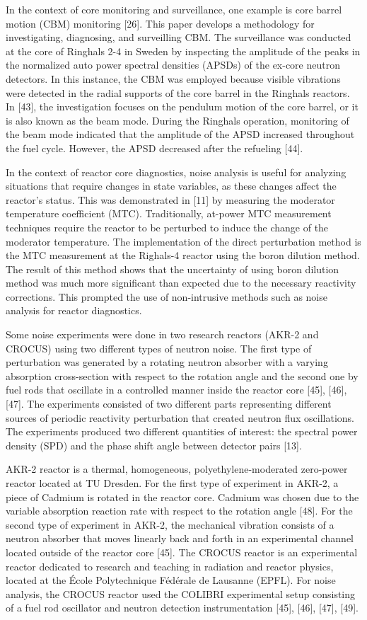 In the context of core monitoring and surveillance, one example is core barrel motion (CBM) monitoring [26]. This paper develops a methodology for investigating, diagnosing, and surveilling CBM. The surveillance was conducted at the core of Ringhals 2-4 in Sweden by inspecting the amplitude of the peaks in the normalized auto power spectral densities (APSDs) of the ex-core neutron detectors. 
In this instance, the CBM was employed because visible vibrations were detected in the radial supports of the core barrel in the Ringhals reactors. In [43], the investigation focuses on the pendulum motion of the core barrel, or it is also known as the beam mode. During the Ringhals operation, monitoring of the beam mode indicated that the amplitude of the APSD increased throughout the fuel cycle. However, the APSD decreased after the refueling [44]. 

In the context of reactor core diagnostics, noise analysis is useful for analyzing situations that require changes in state variables, as these changes affect the reactor's status. This was demonstrated in [11] by measuring the moderator temperature coefficient (MTC). Traditionally, at-power MTC measurement techniques require the reactor to be perturbed to induce the change of the moderator temperature. The implementation of the direct perturbation method is the MTC measurement at the Righals-4 reactor using the boron dilution method. The result of this method shows that the uncertainty of using boron dilution method was much more significant than expected due to the necessary reactivity corrections. This prompted the use of non-intrusive methods such as noise analysis for reactor diagnostics.

Some noise experiments were done in two research reactors (AKR-2 and CROCUS) using two different types of neutron noise. The first type of perturbation was generated by a rotating neutron absorber with a varying absorption cross-section with respect to the rotation angle and the second one by fuel rods that oscillate in a controlled manner inside the reactor core [45], [46], [47]. The experiments consisted of two different parts representing different sources of periodic reactivity perturbation that created neutron flux oscillations. The experiments produced two different quantities of interest: the spectral power density (SPD) and the phase shift angle between detector pairs [13]. 

AKR-2 reactor is a thermal, homogeneous, polyethylene-moderated zero-power reactor located at TU Dresden. For the first type of experiment in AKR-2, a piece of Cadmium is rotated in the reactor core. Cadmium was chosen due to the variable absorption reaction rate with respect to the rotation angle [48]. For the second type of experiment in AKR-2, the mechanical vibration consists of a neutron absorber that moves linearly back and forth in an experimental channel located outside of the reactor core [45]. The CROCUS reactor is an experimental reactor dedicated to research and teaching in radiation and reactor physics, located at the École Polytechnique Fédérale de Lausanne (EPFL). For noise analysis, the CROCUS reactor used the COLIBRI experimental setup consisting of a fuel rod oscillator and neutron detection instrumentation [45], [46], [47], [49]. 


